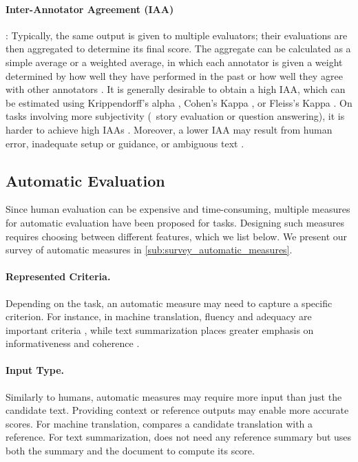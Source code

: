 \paragraph{Inter-Annotator Agreement (IAA)}: Typically, the same output is given to multiple evaluators; their evaluations are then aggregated to determine its final score. The aggregate can be calculated as a simple average or a weighted average, in which each annotator is given a weight determined by how well they have performed in the past or how well they agree with other annotators \citep{raykar2010learning}. It is generally desirable to obtain a high IAA, which can be estimated using Krippendorff's alpha \citep{hayes2007answering}, Cohen's Kappa \citep{cohen1960coefficient}, or Fleiss's Kappa \citep{fleiss1971measuring}. On tasks involving more subjectivity ({\eg}\ story evaluation or question answering), it is harder to achieve high IAAs \citep{amidei-etal-2018-rethinking}. Moreover, a lower IAA may result from human error, inadequate setup or guidance, or ambiguous text \citep{sampson2008definitional}.

\subsection{Automatic Evaluation}

Since human evaluation can be expensive and time-consuming, multiple measures for automatic evaluation have been proposed for {\nlp} tasks. Designing such measures requires choosing between different features, which we list below. We present our survey of automatic measures in \autoref{sub:survey_automatic_measures}.

\paragraph{Represented Criteria.} Depending on the task, an automatic measure may need to capture a specific criterion. For instance, in machine translation, fluency and adequacy are important criteria \citep{graham2017can}, while text summarization places greater emphasis on informativeness and coherence \citep{hassel2004evaluation}.

\paragraph{Input Type.} Similarly to humans, automatic measures may require more input than just the candidate text. Providing context or reference outputs may enable more accurate scores. For machine translation, {\bleu} \citep{papineni2002bleu} compares a candidate translation with a reference. For text summarization, {\blanc} \citep{vasilyev2020fill} does not need any reference summary but uses both the summary and the document to compute its score.

